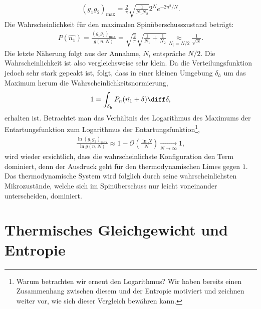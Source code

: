 \begin{align*}
    (g_1g_2)_\mathrm{max}=\frac{2}{\pi}\sqrt{\frac{1}{N_1N_2}}2^Ne^{-2n^2/N}.
\end{align*}
Die Wahrscheinlichkeit für den maximalen Spinüberschusszustand beträgt:
\begin{align*}
    P(\hat{n_1})=\frac{(g_1g_2)_\mathrm{max}}{g(n,N)}=\sqrt{\frac{2}{\pi}}\sqrt{\frac{1}{N_1}+\frac{1}{N_2}}\underset{N_i=N/2}{\approx}\frac{1}{\sqrt{N}}.
\end{align*}
Die letzte Näherung folgt aus der Annahme, $N_i$ entspräche $N/2$. Die Wahrscheinlichkeit ist also vergleichsweise sehr klein. Da die Verteilungsfunktion jedoch sehr stark gepeakt ist, folgt, dass in einer kleinen Umgebung $\delta_h$ um das Maximum herum die Wahrscheinlichkeitsnormierung,
\begin{align*}
    1=\int_\mathrm{\delta_h} P_n(\hat{n_1}+\delta)\diff \delta,
\end{align*}
erhalten ist.
Betrachtet man das Verhältnis des Logarithmus des Maximums der Entartungsfunktion zum Logarithmus der Entartungsfunktion\footnote{Warum betrachten wir erneut den Logarithmus? Wir haben bereits einen Zusammenhang zwischen diesem und der Entropie motiviert und zeichnen weiter vor, wie sich dieser Vergleich bewähren kann.},
\begin{align*}
    \frac{\ln(g_1g_2)_\mathrm{max}}{\ln g(n,N)}\approx 1-\mathcal{O}\left(\frac{\ln N}{N}\right)\underset{N\rightarrow\infty}{\rightarrow}1,
\end{align*}
wird wieder ersichtlich, dass die wahrscheinlichste Konfiguration den Term dominiert, denn der Ausdruck geht für den thermodynamischen Limes gegen $1$. Das thermodynamische System wird folglich durch seine wahrscheinlichsten Mikrozustände, welche sich im Spinüberschuss nur leicht voneinander unterscheiden, dominiert. 
\section{Thermisches Gleichgewicht und Entropie}

